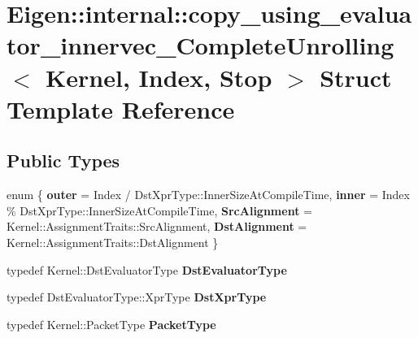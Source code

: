 \hypertarget{struct_eigen_1_1internal_1_1copy__using__evaluator__innervec___complete_unrolling}{}\section{Eigen\+::internal\+::copy\+\_\+using\+\_\+evaluator\+\_\+innervec\+\_\+\+Complete\+Unrolling$<$ Kernel, Index, Stop $>$ Struct Template Reference}
\label{struct_eigen_1_1internal_1_1copy__using__evaluator__innervec___complete_unrolling}
\subsection*{Public Types}
\begin{DoxyCompactItemize}
\item 
\mbox{\label{struct_eigen_1_1internal_1_1copy__using__evaluator__innervec___complete_unrolling_a0310baf2da0112e69e5a9dfa43fe56ae}} 
enum \{ {\bfseries outer} = Index / Dst\+Xpr\+Type\+::Inner\+Size\+At\+Compile\+Time, 
{\bfseries inner} = Index \% Dst\+Xpr\+Type\+::Inner\+Size\+At\+Compile\+Time, 
{\bfseries Src\+Alignment} = Kernel\+::Assignment\+Traits\+::Src\+Alignment, 
{\bfseries Dst\+Alignment} = Kernel\+::Assignment\+Traits\+::Dst\+Alignment
 \}
\item 
\mbox{\label{struct_eigen_1_1internal_1_1copy__using__evaluator__innervec___complete_unrolling_a380af5207fb13006b1a69698fd758082}} 
typedef Kernel\+::\+Dst\+Evaluator\+Type {\bfseries Dst\+Evaluator\+Type}
\item 
\mbox{\label{struct_eigen_1_1internal_1_1copy__using__evaluator__innervec___complete_unrolling_a6b3dce8ef2f1568a09bf18dc15a15f81}} 
typedef Dst\+Evaluator\+Type\+::\+Xpr\+Type {\bfseries Dst\+Xpr\+Type}
\item 
\mbox{\label{struct_eigen_1_1internal_1_1copy__using__evaluator__innervec___complete_unrolling_a0941896241a59f3dd7d288ae55fd236d}} 
typedef Kernel\+::\+Packet\+Type {\bfseries Packet\+Type}
\end{DoxyCompactItemize}
